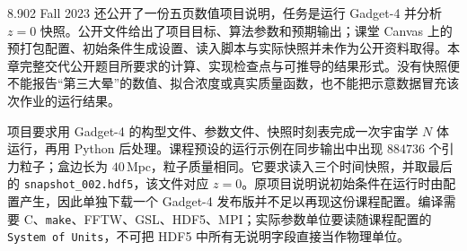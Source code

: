 8.902 Fall 2023 还公开了一份五页数值项目说明，任务是运行 Gadget-4 并分析 $z=0$ 快照。公开文件给出了项目目标、算法参数和预期输出；课堂 Canvas 上的预打包配置、初始条件生成设置、读入脚本与实际快照并未作为公开资料取得。本章完整交代公开题目所要求的计算、实现检查点与可推导的结果形式。没有快照便不能报告“第三大晕”的数值、拟合浓度或真实质量函数，也不能把示意数据冒充该次作业的运行结果。

项目要求用 Gadget-4 的构型文件、参数文件、快照时刻表完成一次宇宙学 $N$ 体运行，再用 Python 后处理。课程预设的运行示例在同步输出中出现 $884736$ 个引力粒子；盒边长为 $40\,\mathrm{Mpc}$，粒子质量相同。它要求读入三个时间快照，并取最后的 \texttt{snapshot\_002.hdf5}，该文件对应 $z=0$。原项目说明说初始条件在运行时由配置产生，因此单独下载一个 Gadget-4 发布版并不足以再现这份课程配置。编译需要 C、\texttt{make}、FFTW、GSL、HDF5、MPI；实际参数单位要读随课程配置的 \texttt{System of Units}，不可把 HDF5 中所有无说明字段直接当作物理单位。

